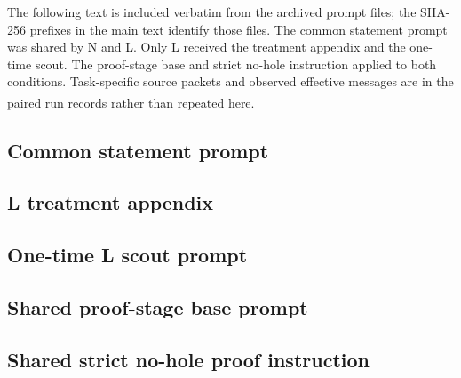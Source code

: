 \documentclass[10pt,a4paper]{article}
\newcommand{\src}[1]{\textsuperscript{\cite{#1}}}
\begin{document}
The following text is included verbatim from the archived prompt files;
the SHA-256 prefixes in the main text identify those files. The common
statement prompt was shared by N and L. Only L received the treatment
appendix and the one-time scout. The proof-stage base and strict no-hole
instruction applied to both conditions. Task-specific source packets and
observed effective messages are in the paired run records rather than
repeated here.\src{prompts,proofprompt,evidence}

\subsection{Common statement prompt}

\subsection{L treatment appendix}

\subsection{One-time L scout prompt}

\subsection{Shared proof-stage base prompt}

\clearpage
\subsection{Shared strict no-hole proof instruction}
\end{document}
